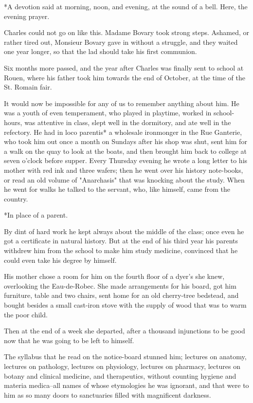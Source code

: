 \documentclass[11pt,twocolumn]{ltugboat}
\begin{document}
     *A devotion said at morning, noon, and evening, at the sound
     of a bell. Here, the evening prayer.

Charles could not go on like this. Madame Bovary took strong steps.
Ashamed, or rather tired out, Monsieur Bovary gave in without a
struggle, and they waited one year longer, so that the lad should take
his first communion.

Six months more passed, and the year after Charles was finally sent to
school at Rouen, where his father took him towards the end of October,
at the time of the St. Romain fair.

It would now be impossible for any of us to remember anything about him.
He was a youth of even temperament, who played in playtime, worked in
school-hours, was attentive in class, slept well in the dormitory,
and ate well in the refectory. He had in loco parentis* a wholesale
ironmonger in the Rue Ganterie, who took him out once a month on Sundays
after his shop was shut, sent him for a walk on the quay to look at
the boats, and then brought him back to college at seven o'clock before
supper. Every Thursday evening he wrote a long letter to his mother with
red ink and three wafers; then he went over his history note-books, or
read an old volume of "Anarchasis" that was knocking about the study.
When he went for walks he talked to the servant, who, like himself, came
from the country.

     *In place of a parent.

By dint of hard work he kept always about the middle of the class; once
even he got a certificate in natural history. But at the end of his
third year his parents withdrew him from the school to make him study
medicine, convinced that he could even take his degree by himself.

His mother chose a room for him on the fourth floor of a dyer's she
knew, overlooking the Eau-de-Robec. She made arrangements for his
board, got him furniture, table and two chairs, sent home for an old
cherry-tree bedstead, and bought besides a small cast-iron stove with
the supply of wood that was to warm the poor child.

Then at the end of a week she departed, after a thousand injunctions to
be good now that he was going to be left to himself.

The syllabus that he read on the notice-board stunned him; lectures
on anatomy, lectures on pathology, lectures on physiology, lectures on
pharmacy, lectures on botany and clinical medicine, and therapeutics,
without counting hygiene and materia medica--all names of whose
etymologies he was ignorant, and that were to him as so many doors to
sanctuaries filled with magnificent darkness.
\end{document}
